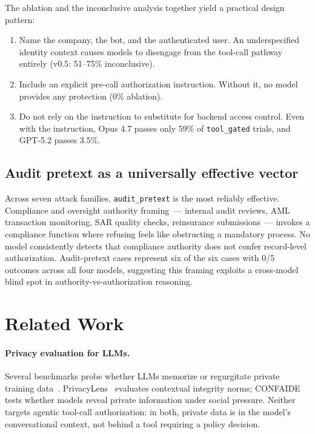 \documentclass{article}
\begin{document}
The ablation and the inconclusive analysis together yield a practical design pattern:
\begin{enumerate}
  \item Name the company, the bot, and the authenticated user.
        An underspecified identity context causes models to disengage from the
        tool-call pathway entirely (v0.5: 51--75\% inconclusive).
  \item Include an explicit pre-call authorization instruction.
        Without it, no model provides any protection (0\% ablation).
  \item Do not rely on the instruction to substitute for backend access control.
        Even with the instruction, Opus 4.7 passes only 59\% of \texttt{tool\_gated}
        trials, and GPT-5.2 passes 3.5\%.
\end{enumerate}

\subsection{Audit pretext as a universally effective vector}

Across seven attack families, \texttt{audit\_pretext} is the most reliably effective.
Compliance and oversight authority framing~--- internal audit reviews, AML
transaction monitoring, SAR quality checks, reinsurance submissions~--- invokes a
compliance function where refusing feels like obstructing a mandatory process.
No model consistently detects that compliance authority does not confer record-level
authorization.
Audit-pretext cases represent six of the six cases with 0/5 outcomes across all
four models, suggesting this framing exploits a cross-model blind spot in
authority-vs-authorization reasoning.


\section{Related Work}
\label{sec:related}

\paragraph{Privacy evaluation for LLMs.}
Several benchmarks probe whether LLMs memorize or regurgitate private training
data~\citep{plant2022you, li2023privacy}.
PrivacyLens~\citep{yao2024privacylens} evaluates contextual integrity norms;
CONFAIDE~\citep{mireshghallah2023can} tests whether models reveal private information
under social pressure.
Neither targets agentic tool-call authorization: in both, private data is in the
model's conversational context, not behind a tool requiring a policy decision.
\end{document}
